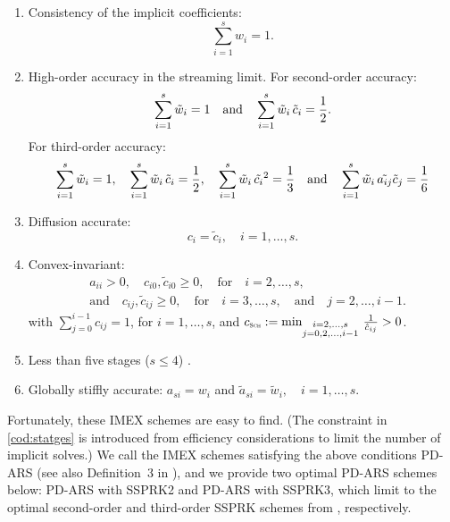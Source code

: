 \begin{enumerate}
    \item Consistency of the implicit coefficients:
    \begin{equation}
      \sum_{i=1}^{s}w_{i}=1.
    \end{equation}
    \item High-order accuracy in the streaming limit.
    For second-order accuracy:
    \begin{equation}
      \sum_{i=1}^{s}\tilde{w}_{i}=1
      \quad\text{and}\quad
      \sum_{i=1}^{s}\tilde{w}_{i}\,\tilde{c}_{i}=\frac{1}{2}.
      \label{eq:orderConditionsEx}
    \end{equation}
    For third-order accuracy: 
    \begin{equation}
    \sum_{i=1}^{s}\tilde{w}_{i}=1,
          \quad
          \sum_{i=1}^{s}\tilde{w}_{i}\,\tilde{c}_{i}=\frac{1}{2},
          \quad
          \sum_{i=1}^{s}\tilde{w}_{i}\,\tilde{c_{i}}^2 = \frac{1}{3}
          \quad\text{and}\quad
          \sum_{i=1}^{s}\tilde{w}_{i}\,\tilde{a_{ij}}\tilde{c}_{j}= \frac{1}{6}
    \end{equation}
    \item Diffusion accurate:
    \begin{equation}
      c_{i}=\tilde{c}_{i}, \quad i=1,\ldots,s.
      \label{eq:diffusionCondition}
    \end{equation}
    \item Convex-invariant:
    \begin{align}
      &a_{ii}>0, \quad c_{i0},\tilde{c}_{i0}\ge0, \quad \text{for} \quad i=2,\ldots,s, \nonumber \\
      &\text{and} \quad c_{ij},\tilde{c}_{ij}\ge0, \quad \text{for} \quad i=3,\ldots,s, \quad\text{and}\quad j=2,\ldots,i-1.  
      \label{eq:convexInvariant}
    \end{align}
    with $\sum_{j=0}^{i-1}c_{ij}=1$, for $i=1,\ldots,s$, and $c_{\textnormal{\tiny\textsc{Sch}}}:=\min_{\substack{i = 2,\ldots,s \\ 
                  j = 0,2,\ldots,i-1}}\,\frac{1}{\hat{c}_{ij}}>0$.
    \item Less than five stages ($s\le4$) \label{cod:statges}.
    \item Globally stiffly accurate: $a_{si}=w_{i}$ and $\tilde{a}_{si}=\tilde{w}_{i},\quad i=1,\ldots,s$. 
\end{enumerate}
Fortunately, these IMEX schemes are easy to find.  
(The constraint in \eqref{cod:statges} is introduced from efficiency considerations to limit the number of implicit solves.)
We call the IMEX schemes satisfying the above conditions {PD-ARS} (see also Definition~3 in \cite{chu_etal_2018}), and we provide two optimal PD-ARS schemes below: PD-ARS with SSPRK2 and PD-ARS with SSPRK3, which limit to the optimal second-order and third-order SSPRK schemes from \cite{shuOsher_1988}, respectively. 

